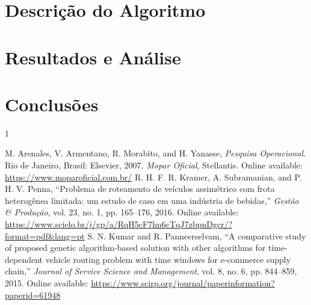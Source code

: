 \documentclass[conference]{IEEEtran}
\begin{document}
\section{Descrição do Algoritmo}

\section{Resultados e Análise}

\section{Conclusões}


\begin{thebibliography}{1}

M. Arenales, V. Armentano, R. Morabito, and H. Yanasse, {\it{Pesquisa Operacional}}. Rio de Janeiro, Brasil: Elsevier, 2007.
{\it{Mopar Oficial}}, Stellantis. Online available: \url{https://www.moparoficial.com.br/}
R. H. F. R. Kramer, A. Subramanian, and P. H. V. Penna, ``Problema de roteamento de veículos assimétrico com frota heterogênea limitada: um estudo de caso em uma indústria de bebidas,'' {\it{Gestão \& Produção}}, vol. 23, no. 1, pp. 165--176, 2016. Online available: \url{https://www.scielo.br/j/gp/a/RqH5cF7hn6cTqJ7zbpnDgcr/?format=pdf&lang=pt}
S. N. Kumar and R. Panneerselvam, ``A comparative study of proposed genetic algorithm-based solution with other algorithms for time-dependent vehicle routing problem with time windows for e-commerce supply chain,'' {\it{Journal of Service Science and Management}}, vol. 8, no. 6, pp. 844--859, 2015. Online available: \url{https://www.scirp.org/journal/paperinformation?paperid=61948}
\end{thebibliography}
\end{document}
